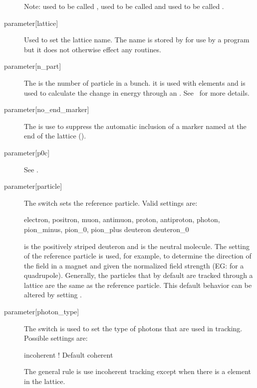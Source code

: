 \begin{description}
Note:  used to be called , 
used to be called  and  used to be
called .
  \item[{parameter[lattice]}] \Newline
Used to set the lattice name. The  name is stored by \bmad
for use by a program but it does not otherwise effect any \bmad
routines.
  \item[{parameter[n_part]}] \Newline
The  is the number of particle in a bunch.
it is used with  elements and is used to calculate the
change in energy through an . See~ for more
details.
  \item[{parameter[no_end_marker]}] \Newline
The  is use to suppress the automatic inclusion
of a marker named  at the end of the lattice (). 
  \item[{parameter[p0c]}] \Newline
See .
  \item[{parameter[particle]}] \Newline
The  switch sets the reference particle. Valid settings are:
\begin{example}
  electron,     positron,   
  muon,         antimuon,
  proton,       antiproton,
  photon, 
  pion_minus,   pion_0,         pion_plus
  deuteron      deuteron_0
\end{example}
 is the positively striped deuteron and 
is the neutral molecule.  The setting of the reference particle is
used, for example, to determine the direction of the field in a magnet
and given the normalized field strength (EG:  for a
quadrupole).  Generally, the particles that by default are tracked
through a lattice are the same as the reference particle. This default
behavior can be altered by setting
.

  \item[{parameter[photon_type]}] \Newline
The  switch is used to set the type of photons that
are used in tracking. Possible settings are:
\begin{example}
  incoherent    ! Default
  coherent 
\end{example}
The general rule is use incoherent tracking except when there is a
 element in the lattice. 


\end{description}
